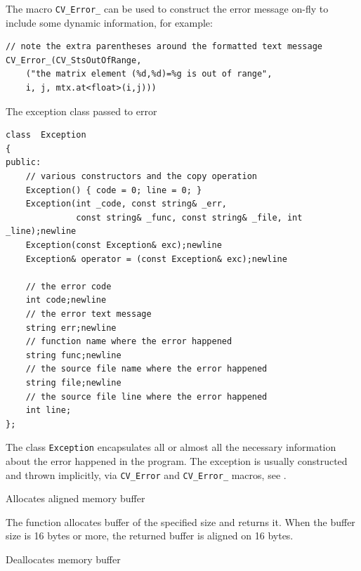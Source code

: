 The macro \texttt{CV\_Error\_} can be used to construct the error message on-fly to include some dynamic information, for example:

\begin{lstlisting}
// note the extra parentheses around the formatted text message
CV_Error_(CV_StsOutOfRange,
    ("the matrix element (%d,%d)=%g is out of range",
    i, j, mtx.at<float>(i,j)))
\end{lstlisting}


\label{Exception}
The exception class passed to error

\begin{lstlisting}
class  Exception
{
public:
    // various constructors and the copy operation
    Exception() { code = 0; line = 0; }
    Exception(int _code, const string& _err,
              const string& _func, const string& _file, int _line);newline
    Exception(const Exception& exc);newline
    Exception& operator = (const Exception& exc);newline

    // the error code
    int code;newline
    // the error text message
    string err;newline
    // function name where the error happened
    string func;newline
    // the source file name where the error happened
    string file;newline
    // the source file line where the error happened
    int line;
};
\end{lstlisting}

The class \texttt{Exception} encapsulates all or almost all the necessary information about the error happened in the program. The exception is usually constructed and thrown implicitly, via \texttt{CV\_Error} and \texttt{CV\_Error\_} macros, see .


Allocates aligned memory buffer

\begin{description}
\end{description}
 
The function allocates buffer of the specified size and returns it. When the buffer size is 16 bytes or more, the returned buffer is aligned on 16 bytes.

Deallocates memory buffer

\begin{description}
\end{description}

